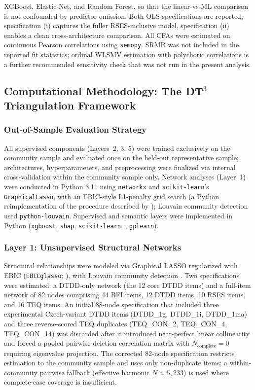 \documentclass[11pt,twocolumn]{article}
\begin{document}
XGBoost, Elastic-Net, and Random Forest, so that the linear-vs-ML comparison is not confounded by predictor omission. Both OLS specifications are reported; specification (i) captures the fuller RSES-inclusive model, specification (ii) enables a clean cross-architecture comparison. All CFAs were estimated on continuous Pearson correlations using \texttt{semopy}. SRMR was not included in the reported fit statistics; ordinal WLSMV estimation with polychoric correlations is a further recommended sensitivity check that was not run in the present analysis.

\subsection{Computational Methodology: The \texorpdfstring{DT$^3$}{DT3} Triangulation Framework}

\subsubsection{Out-of-Sample Evaluation Strategy}

All supervised components (Layers~2, 3, 5) were trained exclusively on the community sample and evaluated once on the held-out representative sample; architectures, hyperparameters, and preprocessing were finalized via internal cross-validation within the community sample only. Network analyses (Layer~1) were conducted in Python 3.11 using \texttt{networkx} and \texttt{scikit-learn}'s \texttt{GraphicalLasso}, with an EBIC-style L1-penalty grid search (a Python reimplementation of the procedure described by \citealp{epskamp2018}); Louvain community detection used \texttt{python-louvain}. Supervised and semantic layers were implemented in Python (\texttt{xgboost}, \texttt{shap}, \texttt{scikit-learn}, \texttt{}, \texttt{gplearn}).

\subsubsection{Layer 1: Unsupervised Structural Networks}
\label{sec:layer1_text}

Structural relationships were modeled via Graphical LASSO regularized with EBIC (\texttt{EBICglasso}; \citealp{epskamp2018}), with Louvain community detection \citep{blondel2008}. Two specifications were estimated: a DTDD-only network (the 12 core DTDD items) and a full-item network of 82 nodes comprising 44 BFI items, 12 DTDD items, 10 RSES items, and 16 TEQ items. An initial 88-node specification that included three experimental Czech-variant DTDD items (DTDD\_1g, DTDD\_1i, DTDD\_1ma) and three reverse-scored TEQ duplicates (TEQ\_CON\_2, TEQ\_CON\_4, TEQ\_CON\_14) was discarded after it introduced near-perfect linear collinearity and forced a pooled pairwise-deletion correlation matrix with $N_{\text{complete}} = 0$ requiring eigenvalue projection. The corrected 82-node specification restricts estimation to the community sample and uses only non-duplicate items; a within-community pairwise fallback (effective harmonic $N \approx 5{,}233$) is used where complete-case coverage is insufficient.
\end{document}
